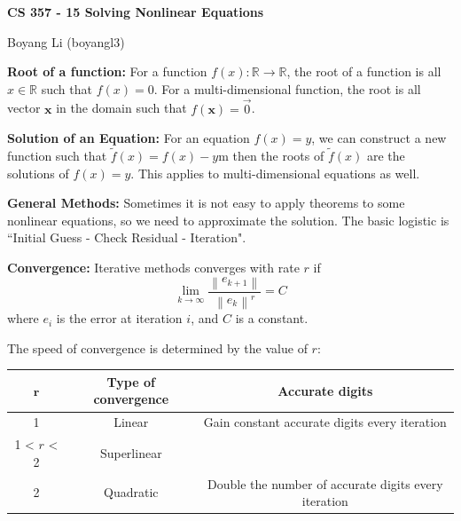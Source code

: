 \documentclass[12pt]{article}
\newcommand\norm[1]{\left\lVert#1\right\rVert}
\begin{document}
\begin{center}\Large\bf 
CS 357 - 15 Solving Nonlinear Equations\\
\end{center}
\begin{center}
Boyang Li (boyangl3)
\end{center}

\medskip

\noindent \textbf{Root of a function: }For a function $f(x) : \mathbb{R} \to \mathbb{R}$, the root of a function is all $x \in \mathbb{R}$ such that $f(x) = 0$. For a multi-dimensional function, the root is all vector $\mathbf{x}$ in the domain such that $f(\mathbf{x}) = \vec{0}$.

\medskip
\noindent \textbf{Solution of an Equation: }For an equation $f(x) = y$, we can construct a new function such that $\tilde{f}(x) = f(x) - y$m then the roots of $\tilde{f}(x)$ are the solutions of $f(x)=y$. This applies to multi-dimensional equations as well.

\medskip
\noindent \textbf{General Methods: }Sometimes it is not easy to apply theorems to some nonlinear equations, so we need to approximate the solution. The basic logistic is ``Initial Guess - Check Residual - Iteration".

\medskip
\noindent \textbf{Convergence: }Iterative methods converges with rate $r$ if
$$\lim_{k \to \infty} \frac{\norm{e_{k+1}}}{\norm{e_k}^r} = C$$
where $e_i$ is the error at iteration $i$, and $C$ is a constant.

The speed of convergence is determined by the value of $r$:
\begin{center}
        \begin{tabular}{ | c | c | c | } 
              \hline
              $\mathbf{r}$ & \textbf{Type of convergence} & \textbf{Accurate digits} \\ 
              \hline
              1 & Linear & Gain constant accurate digits every iteration \\ 
              \hline
              1 < $r$ < 2 & Superlinear & \\ 
              \hline
              2 & Quadratic & Double the number of accurate digits every iteration \\ 
              \hline
        \end{tabular}
    \end{center}
\end{document}
